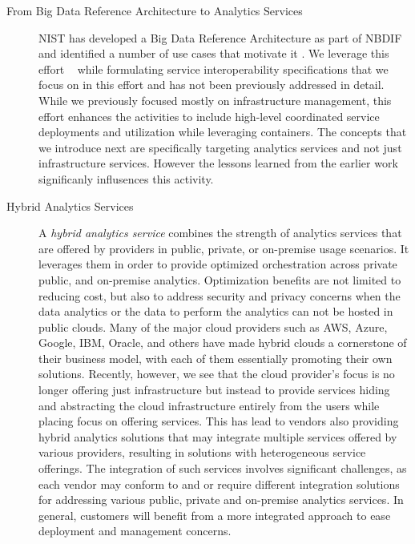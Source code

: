 \begin{description}

\item[From Big Data Reference Architecture to Analytics Services]
\label{s:arch}

NIST has developed a Big Data Reference Architecture as part of
NBDIF\cite{nist-v6} and identified a number of use cases that motivate
it \cite{nist-v3}. We leverage this effort
~\cite{nist-v1,nist-v2,nist-v3,nist-v4,nist-v5,nist-v6,nist-v7,nist-v8,nist-v9}
while formulating service interoperability specifications that we
focus on in this effort and has not been previously addressed in
detail. While we previously focused mostly on infrastructure
management, this effort enhances the activities to include high-level
coordinated service deployments and utilization while leveraging
containers. The concepts that we introduce next are specifically
targeting analytics services and not just infrastructure services.
However the lessons learned from the earlier work significanly
influsences this activity.


\item[Hybrid Analytics Services]

A {\em hybrid analytics service} combines the strength of analytics
services that are offered by providers in public, private, or
on-premise usage scenarios. It leverages them in order to provide
optimized orchestration across private public, and on-premise
analytics. Optimization benefits are not limited to reducing cost, but
also to address security and privacy concerns when the data analytics
or the data to perform the analytics can not be hosted in public
clouds. Many of the major cloud providers such as AWS, Azure, Google,
IBM, Oracle, and others have made hybrid clouds a cornerstone of their
business model, with each of them essentially promoting their own
solutions. Recently, however, we see that the cloud provider's focus
is no longer offering just infrastructure but instead to provide
services hiding and abstracting the cloud infrastructure entirely from
the users while placing focus on offering services.  This has lead to
vendors also providing hybrid analytics solutions that may integrate
multiple services offered by various providers, resulting in solutions
with heterogeneous service offerings. The integration of such services
involves significant challenges, as each vendor may conform to and or
require different integration solutions for addressing various public,
private and on-premise analytics services. In general, customers will
benefit from a more integrated approach to ease deployment and
management concerns.


\end{description}
